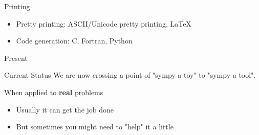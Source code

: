 \documentclass[xcolor=svgnames]{beamer}
\begin{document}
\begin{frame}
  \begin{block}{Printing}
    \begin{itemize}
    \item Pretty printing: ASCII/Unicode pretty printing, LaTeX
    \item Code generation: C, Fortran, Python
    \end{itemize}
  \end{block}
\end{frame}

\begin{frame}{Present}
  \begin{block}{Current Status}
      We are now crossing a point of "sympy a toy" to "sympy a tool".
  \end{block}
  \pause
  \bigskip
  \begin{block}{When applied to \textbf{real} problems}
    \begin{itemize}
    \item Usually it can get the job done
    \item But sometimes you might need to "help" it a little
    \end{itemize}
  \end{block}
\end{frame}
\end{document}

